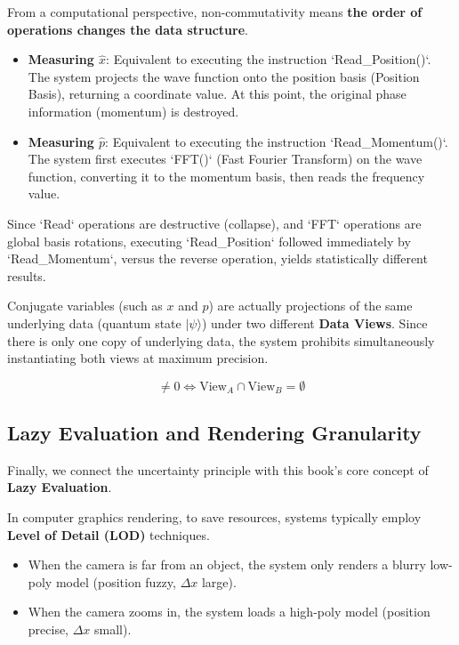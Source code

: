 From a computational perspective, non-commutativity means \textbf{the order of operations changes the data structure}.

\begin{itemize}
\item \textbf{Measuring $\hat{x}$}: Equivalent to executing the instruction `Read_Position()`. The system projects the wave function onto the position basis (Position Basis), returning a coordinate value. At this point, the original phase information (momentum) is destroyed.

\item \textbf{Measuring $\hat{p}$}: Equivalent to executing the instruction `Read_Momentum()`. The system first executes `FFT()` (Fast Fourier Transform) on the wave function, converting it to the momentum basis, then reads the frequency value.
\end{itemize}

Since `Read` operations are destructive (collapse), and `FFT` operations are global basis rotations, executing `Read_Position` followed immediately by `Read_Momentum`, versus the reverse operation, yields statistically different results.

\begin{theorem}
Conjugate variables (such as $x$ and $p$) are actually projections of the same underlying data (quantum state $|\psi\rangle$) under two different \textbf{Data Views}. Since there is only one copy of underlying data, the system prohibits simultaneously instantiating both views at maximum precision.

\begin{equation}
[\hat{A}, \hat{B}] \neq 0 \iff \text{View}_A \cap \text{View}_B = \emptyset
\end{equation}
\end{theorem}

\subsection{Lazy Evaluation and Rendering Granularity}

Finally, we connect the uncertainty principle with this book's core concept of \textbf{Lazy Evaluation}.

In computer graphics rendering, to save resources, systems typically employ \textbf{Level of Detail (LOD)} techniques.

\begin{itemize}
\item When the camera is far from an object, the system only renders a blurry low-poly model (position fuzzy, $\Delta x$ large).

\item When the camera zooms in, the system loads a high-poly model (position precise, $\Delta x$ small).
\end{itemize}

